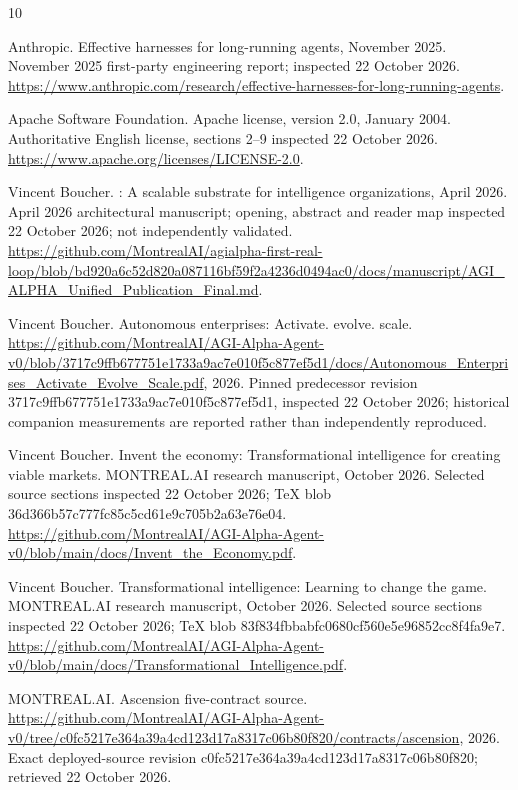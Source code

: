 \documentclass[11pt,letterpaper]{article}
\begin{document}
\begin{thebibliography}{10}

{Anthropic}.
\newblock Effective harnesses for long-running agents, November 2025.
 November 2025 first-party engineering report; inspected 22 October
  2026.
  \url{https://www.anthropic.com/research/effective-harnesses-for-long-running-agents}.

{Apache Software Foundation}.
\newblock Apache license, version 2.0, January 2004.
\newblock Authoritative English license, sections 2--9 inspected 22 October
  2026. \url{https://www.apache.org/licenses/LICENSE-2.0}.

Vincent Boucher.
: A scalable substrate for intelligence organizations,
  April 2026.
 April 2026 architectural manuscript; opening, abstract and reader
  map inspected 22 October 2026; not independently validated.
  \url{https://github.com/MontrealAI/agialpha-first-real-loop/blob/bd920a6c52d820a087116bf59f2a4236d0494ac0/docs/manuscript/AGI_ALPHA_Unified_Publication_Final.md}.

Vincent Boucher.
\newblock Autonomous enterprises: Activate. evolve. scale.
\newblock
  \url{https://github.com/MontrealAI/AGI-Alpha-Agent-v0/blob/3717c9ffb677751e1733a9ac7e010f5c877ef5d1/docs/Autonomous_Enterprises_Activate_Evolve_Scale.pdf},
  2026.
\newblock Pinned predecessor revision 3717c9ffb677751e1733a9ac7e010f5c877ef5d1,
  inspected 22 October 2026; historical companion measurements are reported
  rather than independently reproduced.

Vincent Boucher.
\newblock Invent the economy: Transformational intelligence for creating viable
  markets.
\newblock MONTREAL.AI research manuscript, October 2026.
\newblock Selected source sections inspected 22 October 2026; TeX blob
  36d366b57c777fc85c5cd61e9c705b2a63e76e04.
  \url{https://github.com/MontrealAI/AGI-Alpha-Agent-v0/blob/main/docs/Invent_the_Economy.pdf}.

Vincent Boucher.
\newblock Transformational intelligence: Learning to change the game.
\newblock MONTREAL.AI research manuscript, October 2026.
\newblock Selected source sections inspected 22 October 2026; TeX blob
  83f834fbbabfc0680cf560e5e96852cc8f4fa9e7.
  \url{https://github.com/MontrealAI/AGI-Alpha-Agent-v0/blob/main/docs/Transformational_Intelligence.pdf}.

{MONTREAL.AI}.
\newblock Ascension five-contract source.
\newblock
  \url{https://github.com/MontrealAI/AGI-Alpha-Agent-v0/tree/c0fc5217e364a39a4cd123d17a8317c06b80f820/contracts/ascension},
  2026.
\newblock Exact deployed-source revision
  c0fc5217e364a39a4cd123d17a8317c06b80f820; retrieved 22 October 2026.


\end{thebibliography}
\end{document}

